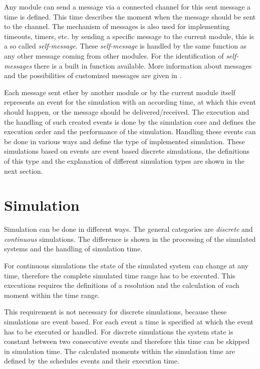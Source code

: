 \documentclass[journal]{IEEEtran}
\begin{document}
Any module can send a message via a connected channel for this sent message a time is defined.
This time describes the moment when the message should be sent to the channel.
The mechanism of messages is also used for implementing timeouts, timers, etc. by sending a specific message to the current module, this is a so called \emph{self-message}.
These \emph{self-message} is handled by the same function as any other message coming from other modules.
For the identification of \emph{self-messages} there is a built in function available.
More information about messages and the possibilities of customized messages are given in \cite[chapter 5]{OMNETMANUAL}.

Each message sent ether by another module or by the current module itself represents an event for the simulation with an according time, at which this event should happen, or the message should be delivered/received.
The execution and the handling of such created events is done by the simulation core and defines the execution order and the performance of the simulation.
Handling these events can be done in various ways and define the type of implemented simulation.
These simulations based on events are event based discrete simulations, the definitions of this type and the explanation of different simulation types are shown in the next section.

\section{Simulation}
\label{sec:Simulation}
Simulation can be done in different ways. The general categories are \emph{discrete} and \emph{continuous} simulations.
The difference is shown in the processing of the simulated systems and the handling of simulation time.

For continuous simulations the state of the simulated system can change at any time, therefore the complete simulated time range has to be executed.
This executions requires the definitions of a resolution and the calculation of each moment within the time range.

This requirement is not necessary for discrete simulations, because these simulations are event based.
For each event a time is specified at which the event has to be executed or handled.
For discrete simulations the system state is constant between two consecutive events and therefore this time can be skipped in simulation time.
The calculated moments within the simulation time are defined by the schedules events and their execution time.
\end{document}
